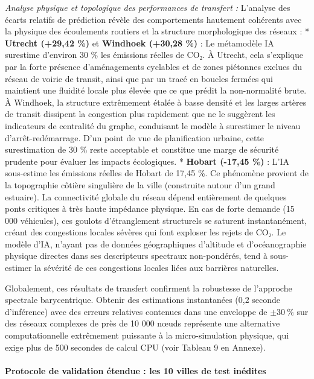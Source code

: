 \documentclass[10pt, a4paper]{article}
\begin{document}
\emph{Analyse physique et topologique des performances de transfert :}
L'analyse des écarts relatifs de prédiction révèle des comportements
hautement cohérents avec la physique des écoulements routiers et la
structure morphologique des réseaux : * \textbf{Utrecht (+29,42 \%)} et
\textbf{Windhoek (+30,28 \%)} : Le métamodèle IA surestime d'environ 30
\% les émissions réelles de CO₂. À Utrecht, cela s'explique par la forte
présence d'aménagements cyclables et de zones piétonnes exclues du
réseau de voirie de transit, ainsi que par un tracé en boucles fermées
qui maintient une fluidité locale plus élevée que ce que prédit la
non-normalité brute. À Windhoek, la structure extrêmement étalée à basse
densité et les larges artères de transit dissipent la congestion plus
rapidement que ne le suggèrent les indicateurs de centralité du graphe,
conduisant le modèle à surestimer le niveau d'arrêt-redémarrage. D'un
point de vue de planification urbaine, cette surestimation de 30 \%
reste acceptable et constitue une marge de sécurité prudente pour
évaluer les impacts écologiques. * \textbf{Hobart (-17,45 \%)} : L'IA
sous-estime les émissions réelles de Hobart de 17,45 \%. Ce phénomène
provient de la topographie côtière singulière de la ville (construite
autour d'un grand estuaire). La connectivité globale du réseau dépend
entièrement de quelques ponts critiques à très haute impédance physique.
En cas de forte demande (15 000 véhicules), ces goulots d'étranglement
structurels se saturent instantanément, créant des congestions locales
sévères qui font exploser les rejets de CO₂. Le modèle d'IA, n'ayant pas
de données géographiques d'altitude et d'océanographie physique directes
dans ses descripteurs spectraux non-pondérés, tend à sous-estimer la
sévérité de ces congestions locales liées aux barrières naturelles.

Globalement, ces résultats de transfert confirment la robustesse de
l'approche spectrale barycentrique. Obtenir des estimations instantanées
(0,2 seconde d'inférence) avec des erreurs relatives contenues dans une
enveloppe de \(\pm 30\ \%\) sur des réseaux complexes de près de 10 000
nœuds représente une alternative computationnelle extrêmement puissante
à la micro-simulation physique, qui exige plus de 500 secondes de calcul
CPU (voir Tableau 9 en Annexe).

\paragraph{Protocole de validation étendue : les 10 villes de test
inédites}\label{protocole-de-validation-uxe9tendue-les-10-villes-de-test-inuxe9dites}
\end{document}
